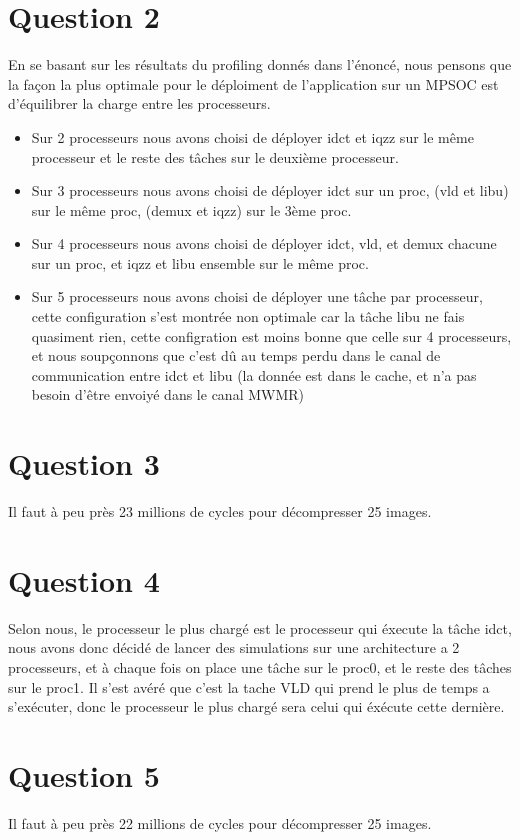 \documentclass[12pt]{article}
\begin{document}
\section*{Question 2}
En se basant sur les résultats du profiling donnés dans l'énoncé, nous pensons que la façon la plus optimale pour le déploiment de l'application sur un MPSOC est d'équilibrer la charge entre les processeurs.\\ 
\begin{itemize}
\item Sur 2 processeurs nous avons choisi de déployer idct et iqzz sur le même processeur et le reste des tâches sur le deuxième processeur.\\
\item Sur 3 processeurs nous avons choisi de déployer idct sur un proc, (vld et libu) sur le même proc, (demux et iqzz) sur le 3ème proc.\\
\item Sur 4 processeurs nous avons choisi de déployer idct, vld, et demux chacune sur un proc, et iqzz et libu ensemble sur le même proc.\\
\item Sur 5 processeurs nous avons choisi de déployer une tâche par processeur, cette configuration s'est montrée non optimale car la tâche libu ne fais quasiment rien, cette configration est moins bonne que celle sur 4 processeurs, et nous soupçonnons que c'est dû au temps perdu dans le canal de communication entre idct et libu (la donnée est dans le cache, et n'a pas besoin d'être envoiyé dans le canal MWMR)
\end{itemize}
\section*{Question 3}
Il faut à peu près 23 millions de cycles pour décompresser 25 images.
\section*{Question 4}
Selon nous, le processeur le plus chargé est le processeur qui éxecute la tâche idct, nous avons donc décidé de lancer des simulations sur une architecture a 2 processeurs, et à chaque fois on place une tâche sur le proc0, et le reste des tâches sur le proc1. Il s'est avéré que c'est la tache VLD qui prend le plus de temps a s'exécuter, donc le processeur le plus chargé sera celui qui éxécute cette dernière.
\section*{Question 5}
Il faut à peu près 22 millions de cycles pour décompresser 25 images.
\end{document}
